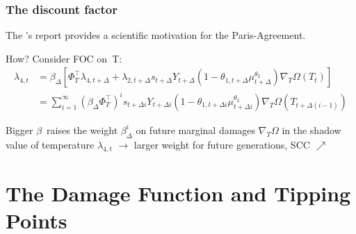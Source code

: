 \documentclass[xcolor=x11names,compress,aspectratio=169]{beamer}%
\makeatletter
\newenvironment{stepitemizewithalert}{\begin{itemize}[<+-| alert@+>]}{\end{itemize} }
\renewenvironment{itemize}{\begin{compactitemize}[<+-| alert@+>]}{\end{compactitemize}}
\renewenvironment{stepitemizewithalert}{\begin{compactitemize}[<+-| alert@+>]}{\end{compactitemize}}
\renewenvironment{stepitemizewithalert}{\begin{itemize}}{\end{itemize}}
\makeatother
\begin{document}
\begin{frame}%
%

\frametitle{The discount factor}%


\begin{stepitemizewithalert}
\item The \cite{stern2006stern}'s report provides a scientific motivation for
the Paris-Agreement.
\vspace{1.5ex}%


\item How? Consider FOC on\ T:%
\begin{align*}
\lambda_{4,t} &  =\beta_{\Delta}\left[  \Phi_{T}^{\top}\lambda_{4,t+\Delta
}+\lambda_{2,t+\Delta}s_{t+\Delta}Y_{t+\Delta}\left(  1-\theta_{1,t+\Delta}%
\mu_{t+\Delta}^{\theta_{2}}\right)  \nabla_{T}\Omega\left(  T_{t}\right)
\right]  \\
&  =\sum\limits_{i=1}^{\infty}\left(  \beta_{\Delta}\Phi_{T}^{\top}\right)
^{i}s_{t+\Delta i}Y_{t+\Delta i}\left(  1-\theta_{1,t+\Delta i}\mu_{t+\Delta
i}^{\theta_{2}}\right)  \nabla_{T}\Omega\left(  T_{t+\Delta\left(  i-1\right)
}\right)
\end{align*}%
\vspace{1.5ex}%


\item Bigger $\beta$\ raises the weight $\beta_{\Delta}^{i}$ on future marginal
damages $\nabla_{T}\Omega$ in the shadow value of temperature $\lambda_{4,t}$
$\rightarrow$ larger weight for future generations, SCC $\nearrow$
\end{stepitemizewithalert}

%

\transboxout
\end{frame}%


\section{The Damage Function and Tipping Points}%
\end{document}
